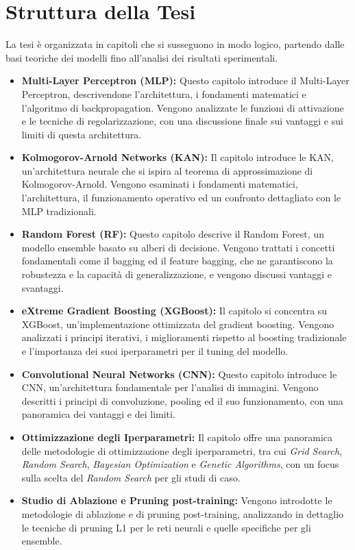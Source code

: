 \documentclass[a4paper,12pt]{report}
\begin{document}
	\section*{Struttura della Tesi}
	La tesi è organizzata in capitoli che si susseguono in modo logico, partendo dalle basi teoriche dei modelli fino all'analisi dei risultati sperimentali. \\
	\begin{itemize}[leftmargin=*]
		\item \textbf{Multi-Layer Perceptron (MLP):} Questo capitolo introduce il Multi-Layer Perceptron, descrivendone l'architettura, i fondamenti matematici e l'algoritmo di backpropagation. Vengono analizzate le funzioni di attivazione e le tecniche di regolarizzazione, con una discussione finale sui vantaggi e sui limiti di questa architettura.
		\item \textbf{Kolmogorov-Arnold Networks (KAN):} Il capitolo introduce le KAN, un'architettura neurale che si ispira al teorema di approssimazione di Kolmogorov-Arnold. Vengono esaminati i fondamenti matematici, l'architettura, il funzionamento operativo ed un confronto dettagliato con le MLP tradizionali.
		\item \textbf{Random Forest (RF):} Questo capitolo descrive il Random Forest, un modello ensemble basato su alberi di decisione. Vengono trattati i concetti fondamentali come il bagging ed il feature bagging, che ne garantiscono la robustezza e la capacità di generalizzazione, e vengono discussi vantaggi e svantaggi.
		\item \textbf{eXtreme Gradient Boosting (XGBoost):} Il capitolo si concentra su XGBoost, un'implementazione ottimizzata del gradient boosting. Vengono analizzati i principi iterativi, i miglioramenti rispetto al boosting tradizionale e l'importanza dei suoi iperparametri per il tuning del modello.
		\item \textbf{Convolutional Neural Networks (CNN):} Questo capitolo introduce le CNN, un'architettura fondamentale per l'analisi di immagini. Vengono descritti i principi di convoluzione, pooling ed il suo funzionamento, con una panoramica dei vantaggi e dei limiti.
		\item \textbf{Ottimizzazione degli Iperparametri:} Il capitolo offre una panoramica delle metodologie di ottimizzazione degli iperparametri, tra cui \textit{Grid Search}, \textit{Random Search}, \textit{Bayesian Optimization} e \textit{Genetic Algorithms}, con un focus sulla scelta del \textit{Random Search} per gli studi di caso.
		\item \textbf{Studio di Ablazione e Pruning post-training:} Vengono introdotte le metodologie di ablazione e di pruning post-training, analizzando in dettaglio le tecniche di pruning L1 per le reti neurali e quelle specifiche per gli ensemble.

\end{itemize}
\end{document}
